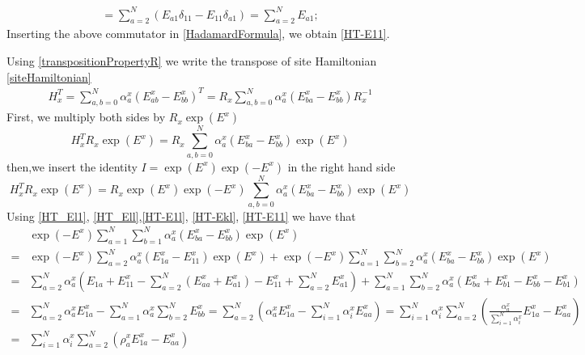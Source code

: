 \documentclass[11pt]{article}
\numberwithin{equation}{section}
\numberwithin{equation}{subsection}
\begin{document}
\begin{enumerate}
\begin{align*}
[E,E_{11}]=\sum_{a=2}^{N}\left(E_{a1}\delta_{11}-E_{1 1}\delta_{a1}\right)=\sum_{a=2}^{N}E_{a1};
\end{align*}
  Inserting the above commutator in \eqref{HadamardFormula}, we obtain \eqref{HT-E11}.
\end{enumerate}
Using \eqref{transpositionPropertyR} we write the transpose of site Hamiltonian \eqref{siteHamiltonian} 
\begin{equation}
    \begin{split}
H_{x}^{T}=\sum_{a,b=0}^{N}\alpha_{a}^{x}\left(E_{ab}^{x}-E_{bb}^{x}\right)^{T}=R_{x}\sum_{a,b=0}^{N}\alpha_{a}^{x}\left(E_{b a}^{x}-E_{bb}^{x}\right)R_{x}^{-1}
    \end{split}
\end{equation}
First, we multiply both sides by $R_{x}\exp{(E^{x})}$
\begin{equation}
    H_{x}^{T}R_{x}\exp{(E^{x})}=R_{x}\sum_{a,b =0}^{N}\alpha_{a}^{x}\left(E_{b a}^{x}-E_{bb}^{x}\right)\exp{(E^{x})}
\end{equation}
then,we insert the identity $I=\exp{(E^{x})}\exp{(-E^{x})}$ in the right hand side
\begin{equation}\label{intermediateTransposeSite}
H_{x}^{T}R_{x}\exp{(E^{x})}=R_{x}\exp{(E^{x})}\exp{(-E^{x})}\sum_{a,b=0}^{N}\alpha_{a}^{x}\left(E_{b a}^{x}-E_{bb}^{x}\right)\exp{(E^{x})}
\end{equation}
 Using \eqref{HT_El1}, \eqref{HT_Ell},\eqref{HT-E1l}, \eqref{HT-Ekl}, \eqref{HT-E11} we have that 
\begin{align*}
    &\exp{(-E^{x})}\sum_{a=1}^{N}\sum_{b=1}^{N}\alpha_{a}^{x}\left(E_{b a}^{x}-E_{bb}^{x}\right)\exp{(E^{x})}
    \\=&
     \exp{(-E^{x})}\sum_{a=2}^{N}\alpha_{a}^{x}\left(E_{1a}^{x}-E_{11}^{x}\right)\exp{(E^{x})}
     + \exp{(-E^{x})}\sum_{a=1}^{N}\sum_{b=2}^{N}\alpha_{a}^{x}\left(E_{b a}^{x}-E_{bb}^{x}\right)\exp{(E^{x})}
     \\=&
     \sum_{a=2}^{N}\alpha_{a}^{x}\left(E_{1a}+E_{11}^{x}-\sum_{a=2}^{N}(E_{aa}^{x}+E_{a1}^{x})-E_{11}^{x}+\sum_{a=2}^{N}E_{a1}^{x}\right)+\sum_{a=1}^{N}\sum_{b =2}^{N}\alpha_{a}^{x}\left(E_{b a}^{x}+E_{b 1}^{x}-E_{bb}^{x}-E_{b 1}^{x}\right)
     \\=&
\sum_{a=2}^{N}\alpha_{a}^{x}E_{1a}^{x}-\sum_{a=1}^{N}\alpha_{a}^{x}\sum_{b=2}^{N}E_{bb}^{x}
=
     \sum_{a=2}^{N}\left(\alpha_{a}^{x}E_{1a}^{x}-\sum_{i=1}^{N}\alpha_{i}^{x}E_{aa}^{x}\right)
=
\sum_{i=1}^{N}\alpha_{i}^{x}\sum_{a=2}^{N}\left(\frac{\alpha_{a}^{x}}{\sum_{i=1}^{N}\alpha_{i}^{x}}E_{1a}^{x}-E_{aa}^{x}\right)
\\=&
\sum_{i=1}^{N}\alpha_{i}^{x}\sum_{a=2}^{N}\left(\rho_{a}^{x}E_{1a}^{x}-E_{aa}^{x}\right)
 \end{align*}
\end{document}
